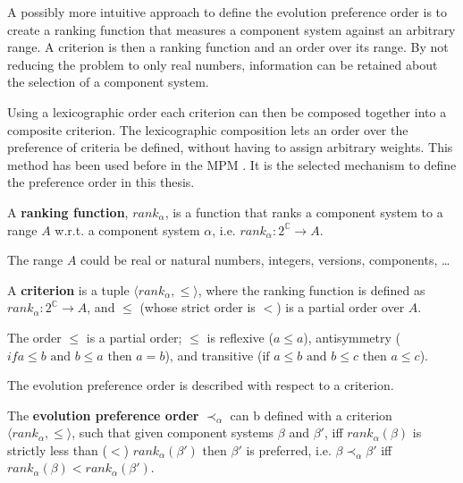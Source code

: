 A possibly more intuitive approach to define the evolution preference order is to create a ranking function that measures a component system against an arbitrary range.
A criterion is then a ranking function and an order over its range. 
By not reducing the problem to only real numbers, information can be retained about the selection of a component system.

Using a lexicographic order each criterion can then be composed together into a composite criterion.
The lexicographic composition lets an order over the preference of criteria be defined, without having to assign arbitrary weights.
This method has been used before in the MPM \citep{abate2011}.
It is the selected mechanism to define the preference order in this thesis.

\begin{defs}
A \textbf{ranking function}, $rank_{\alpha}$, is a function that ranks a component system to a range $A$ w.r.t. a component system $\alpha$, i.e. $rank_{\alpha} : 2^{\mathbb{C}} \rightarrow A$.
\end{defs}
The range $A$ could be real or natural numbers, integers, versions, components, \ldots

\begin{defs}
\label{formal.defcriteria}
A \textbf{criterion} is a tuple $\langle rank_{\alpha}, \leq \rangle$, 
where the ranking function is defined as $rank_{\alpha} : 2^{\mathbb{C}} \rightarrow A$, and $\leq$ (whose strict order is $<$) is a partial order over $A$.
\end{defs}
The order $\leq$ is a partial order; $\leq$ is reflexive ($a \leq a$), antisymmetry ($if a \leq b \text{ and } b \leq a \text{ then } a = b$), and transitive ($ \text{if } a \leq b  \text{ and } b \leq c  \text{ then } a \leq c$).

The evolution preference order is described with respect to a criterion.
\begin{defs}
\label{formal.defcrittooptimal}
The \textbf{evolution preference order} $\prec_{\alpha}$ can b defined with a criterion $\langle rank_{\alpha}, \leq \rangle$,
such that given component systems $\beta$ and $\beta'$, iff $rank_{\alpha}(\beta)$ is strictly less than ($<$) $rank_{\alpha}(\beta')$ then $\beta'$ is preferred, 
i.e. $\beta \prec_{\alpha} \beta'$ iff $rank_{\alpha}(\beta) < rank_{\alpha}(\beta')$.
\end{defs}


